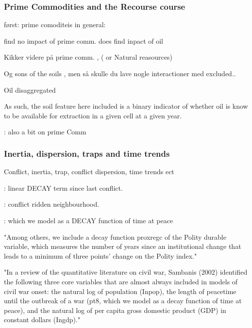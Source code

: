 \documentclass[a4paper]{article}
\begin{document}
\subsubsection{Prime Commodities and the Recourse course} %

først: prime comoditeis in general:
\cite{Collier_Hoeffler_1998, Collier_Hoeffler_2004}

find no impact of prime comm. \cite[76]{Fearon_Laitin_2003} does find inpact of oil \cite[84-86]{Fearon_Laitin_2003}


Kikker videre på prime comm. \cite{Fearon_2005}, ( or Natural reasources) \cite{Ross_2004}

Og sons of the soils \cite{Fearon_2004}, men så skulle du lave nogle interactioner med excluded..

\cite{Buhaug_2010} Oil disaggregated

As such, the soil feature here included is a binary indicator of whether oil is know to be available for extraction in a given cell at a given year. %

\cite{Hegre_Oestby_Raleigh_2009} : also a bit on prime Comm




\subsubsection{Inertia, dispersion, traps and time trends} %


Conflict, inertia, trap, conflict dispersion, time trends ect

\cite{Collier_Hoeffler_2004} : linear DECAY term since last conflict.

\cite{Goldstone_2010} : conflict ridden neighbourhood.

\cite{Hegre_Sambanis_2006} : which we model as a DECAY function of time at peace

"Among others, we include a decay function proxregc of the Polity
durable variable, which measures the number of years since an institutional change
that leads to a minimum of three points' change on the Polity index."

"In a review of the quantitative literature on civil war, Sambanis
(2002) identified the following three core variables that are almost always included
in models of civil war onset: the natural log of population (Inpop), the length of
peacetime until the outbreak of a war (pt8, which we model as a decay function of
time at peace), and the natural log of per capita gross domestic product (GDP) in
constant dollars (Ingdp)."
\end{document}
